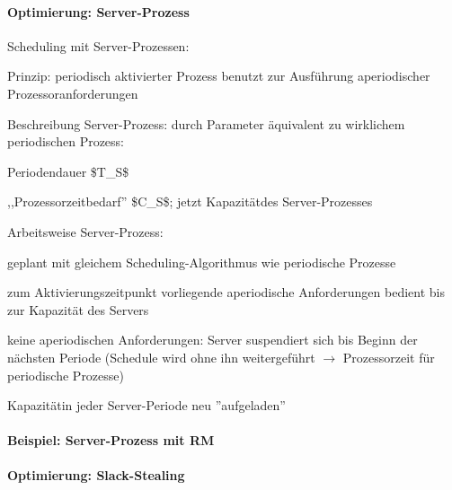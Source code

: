 \documentclass[a4paper]{article}
\begin{document}
\begin{multicols}{3}
    \paragraph{Optimierung:
        Server-Prozess}

    \begin{itemize*}
        \item
        Scheduling mit Server-Prozessen:
        \begin{itemize*}
            \item Prinzip: periodisch aktivierter Prozess benutzt zur Ausführung aperiodischer Prozessoranforderungen
            \item Beschreibung Server-Prozess: durch Parameter äquivalent zu wirklichem periodischen Prozess: \begin{itemize*} \item   Periodendauer \$T\_S\$ \item   ,,Prozessorzeitbedarf'' \$C\_S\$; jetzt Kapazitätdes   Server-Prozesses \end{itemize*}
            \item Arbeitsweise Server-Prozess: \begin{itemize*} \item   geplant mit gleichem Scheduling-Algorithmus wie periodische   Prozesse \item   zum Aktivierungszeitpunkt vorliegende aperiodische Anforderungen   bedient bis zur Kapazität des Servers \item   keine aperiodischen Anforderungen: Server suspendiert sich bis   Beginn der nächsten Periode (Schedule wird ohne ihn weitergeführt   $\rightarrow$  Prozessorzeit für periodische   Prozesse) \item   Kapazitätin jeder Server-Periode neu ''aufgeladen'' \end{itemize*}
        \end{itemize*}
    \end{itemize*}


    \paragraph{Beispiel: Server-Prozess mit
        RM}



    \paragraph{Optimierung:
        Slack-Stealing}


\end{multicols}
\end{document}
